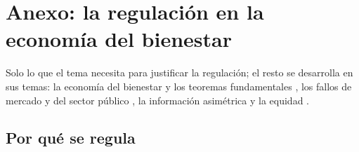 \documentclass[11pt]{article}
\begin{document}
\section{Anexo: la regulación en la economía del bienestar}\label{anexo:bienestar-regulacion}

\begin{anotaciones}
Solo lo que el tema necesita para justificar la regulación; el resto se desarrolla en sus temas: la economía del bienestar y los teoremas fundamentales , los fallos de mercado y del sector público , la información asimétrica  y la equidad .
\end{anotaciones}

\subsection{Por qué se regula}\label{anexo:bienestar-historia}
\end{document}
